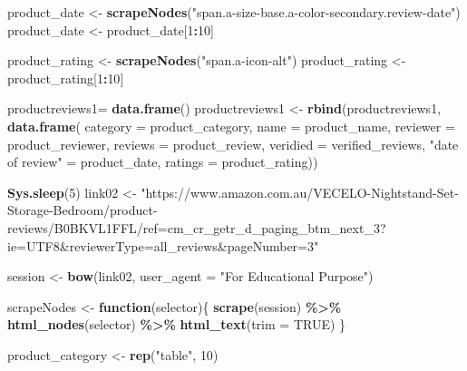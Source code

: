 \documentclass[
]{article}
\newenvironment{Shaded}{\begin{snugshade}}{\end{snugshade}}
\newcommand{\AttributeTok}[1]{\textcolor[rgb]{0.13,0.29,0.53}{#1}}
\newcommand{\ConstantTok}[1]{\textcolor[rgb]{0.56,0.35,0.01}{#1}}
\newcommand{\ControlFlowTok}[1]{\textcolor[rgb]{0.13,0.29,0.53}{\textbf{#1}}}
\newcommand{\DecValTok}[1]{\textcolor[rgb]{0.00,0.00,0.81}{#1}}
\newcommand{\FunctionTok}[1]{\textcolor[rgb]{0.13,0.29,0.53}{\textbf{#1}}}
\newcommand{\NormalTok}[1]{#1}
\newcommand{\OtherTok}[1]{\textcolor[rgb]{0.56,0.35,0.01}{#1}}
\newcommand{\SpecialCharTok}[1]{\textcolor[rgb]{0.81,0.36,0.00}{\textbf{#1}}}
\newcommand{\StringTok}[1]{\textcolor[rgb]{0.31,0.60,0.02}{#1}}
\begin{document}
\begin{Shaded}
\begin{Highlighting}[]
\NormalTok{  product\_date }\OtherTok{\textless{}{-}} \FunctionTok{scrapeNodes}\NormalTok{(}\StringTok{"span.a{-}size{-}base.a{-}color{-}secondary.review{-}date"}\NormalTok{)}
\NormalTok{  product\_date }\OtherTok{\textless{}{-}}\NormalTok{ product\_date[}\DecValTok{1}\SpecialCharTok{:}\DecValTok{10}\NormalTok{]}
  
\NormalTok{  product\_rating }\OtherTok{\textless{}{-}} \FunctionTok{scrapeNodes}\NormalTok{(}\StringTok{"span.a{-}icon{-}alt"}\NormalTok{)}
\NormalTok{  product\_rating }\OtherTok{\textless{}{-}}\NormalTok{ product\_rating[}\DecValTok{1}\SpecialCharTok{:}\DecValTok{10}\NormalTok{]}
  
\NormalTok{  productreviews1}\OtherTok{=} \FunctionTok{data.frame}\NormalTok{()}
\NormalTok{  productreviews1 }\OtherTok{\textless{}{-}} \FunctionTok{rbind}\NormalTok{(productreviews1, }\FunctionTok{data.frame}\NormalTok{(}
                      \AttributeTok{category =}\NormalTok{ product\_category,}
                      \AttributeTok{name =}\NormalTok{ product\_name,}
                      \AttributeTok{reviewer =}\NormalTok{ product\_reviewer,}
                      \AttributeTok{reviews =}\NormalTok{ product\_review,}
                      \AttributeTok{veridied =}\NormalTok{ verified\_reviews,}
                      \StringTok{"date of review"} \OtherTok{=}\NormalTok{ product\_date,}
                      \AttributeTok{ratings =}\NormalTok{ product\_rating))}

  
 \FunctionTok{Sys.sleep}\NormalTok{(}\DecValTok{5}\NormalTok{)}
\NormalTok{link02 }\OtherTok{\textless{}{-}} \StringTok{"https://www.amazon.com.au/VECELO{-}Nightstand{-}Set{-}Storage{-}Bedroom/product{-}reviews/B0BKVL1FFL/ref=cm\_cr\_getr\_d\_paging\_btm\_next\_3?ie=UTF8\&reviewerType=all\_reviews\&pageNumber=3"}


\NormalTok{  session }\OtherTok{\textless{}{-}} \FunctionTok{bow}\NormalTok{(link02,}
               \AttributeTok{user\_agent =} \StringTok{"For Educational Purpose"}\NormalTok{)}

\NormalTok{  scrapeNodes }\OtherTok{\textless{}{-}} \ControlFlowTok{function}\NormalTok{(selector)\{}
    \FunctionTok{scrape}\NormalTok{(session) }\SpecialCharTok{\%\textgreater{}\%}
      \FunctionTok{html\_nodes}\NormalTok{(selector) }\SpecialCharTok{\%\textgreater{}\%}
      \FunctionTok{html\_text}\NormalTok{(}\AttributeTok{trim =} \ConstantTok{TRUE}\NormalTok{)}
\NormalTok{  \}}

\NormalTok{  product\_category }\OtherTok{\textless{}{-}} \FunctionTok{rep}\NormalTok{(}\StringTok{"table"}\NormalTok{, }\DecValTok{10}\NormalTok{)}


\end{Highlighting}
\end{Shaded}
\end{document}

